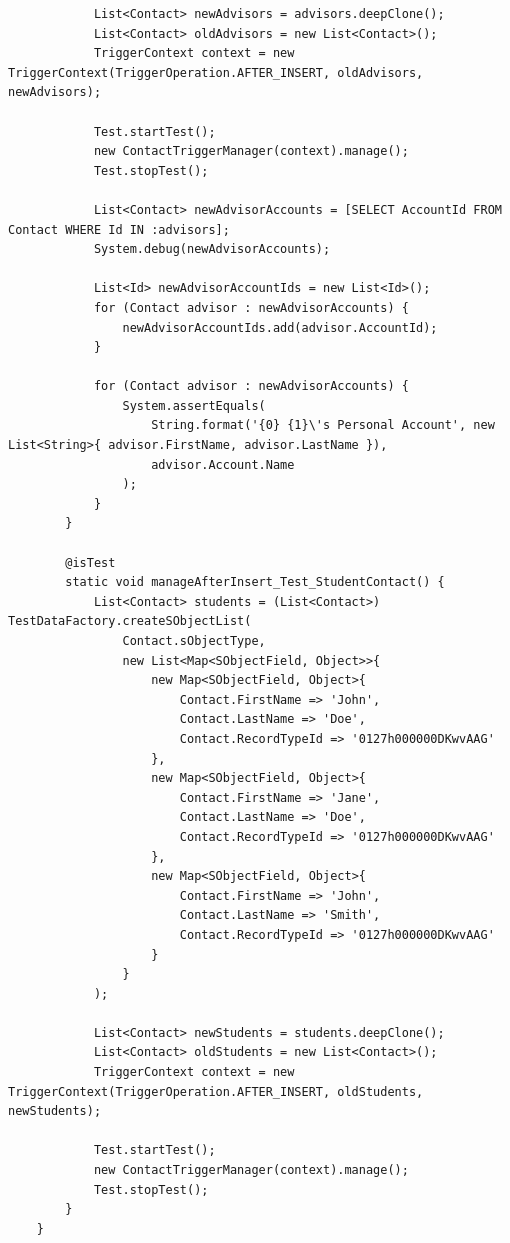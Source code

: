\documentclass[12pt]{article}
\begin{document}
\begin{lstlisting}
            List<Contact> newAdvisors = advisors.deepClone();
            List<Contact> oldAdvisors = new List<Contact>();
            TriggerContext context = new TriggerContext(TriggerOperation.AFTER_INSERT, oldAdvisors, newAdvisors);
    
            Test.startTest();
            new ContactTriggerManager(context).manage();
            Test.stopTest();
    
            List<Contact> newAdvisorAccounts = [SELECT AccountId FROM Contact WHERE Id IN :advisors];
            System.debug(newAdvisorAccounts);
    
            List<Id> newAdvisorAccountIds = new List<Id>();
            for (Contact advisor : newAdvisorAccounts) {
                newAdvisorAccountIds.add(advisor.AccountId);
            }
    
            for (Contact advisor : newAdvisorAccounts) {
                System.assertEquals(
                    String.format('{0} {1}\'s Personal Account', new List<String>{ advisor.FirstName, advisor.LastName }),
                    advisor.Account.Name
                );
            }
        }
    
        @isTest
        static void manageAfterInsert_Test_StudentContact() {
            List<Contact> students = (List<Contact>) TestDataFactory.createSObjectList(
                Contact.sObjectType,
                new List<Map<SObjectField, Object>>{
                    new Map<SObjectField, Object>{
                        Contact.FirstName => 'John',
                        Contact.LastName => 'Doe',
                        Contact.RecordTypeId => '0127h000000DKwvAAG'
                    },
                    new Map<SObjectField, Object>{
                        Contact.FirstName => 'Jane',
                        Contact.LastName => 'Doe',
                        Contact.RecordTypeId => '0127h000000DKwvAAG'
                    },
                    new Map<SObjectField, Object>{
                        Contact.FirstName => 'John',
                        Contact.LastName => 'Smith',
                        Contact.RecordTypeId => '0127h000000DKwvAAG'
                    }
                }
            );

            List<Contact> newStudents = students.deepClone();
            List<Contact> oldStudents = new List<Contact>();
            TriggerContext context = new TriggerContext(TriggerOperation.AFTER_INSERT, oldStudents, newStudents);
    
            Test.startTest();
            new ContactTriggerManager(context).manage();
            Test.stopTest();
        }
    }


\end{lstlisting}
\end{document}
